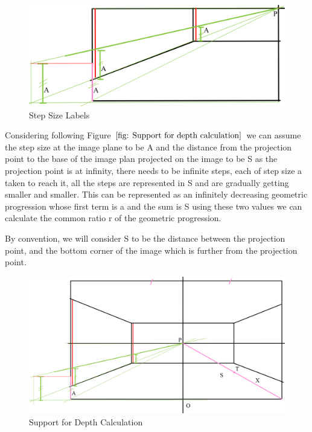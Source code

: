 \documentclass[12pt]{report}
\begin{document}
\begin{figure}[H]
    \centering
    \includegraphics[width=1.0\textwidth]{Calculations6.jpeg}
    \caption{Step Size Labels}
    \label{fig: Step Size label}
\end{figure}

Considering following Figure $\ref{fig: Support for depth calculation}$ we can assume the step size at the image plane to be A and the distance from the projection point to the base of the image plan projected on the image to be S as the projection point is at infinity, there needs to be infinite steps, each of step size a taken to reach it, all the steps are represented in S and are gradually getting smaller and smaller. This can be represented as an infinitely decreasing geometric progression whose first term is a and the sum is S using these two values we can calculate the common ratio r of the geometric progression.\newline

By convention, we will consider S to be the distance between the projection point, and the bottom corner of the image which is further from the projection point.\newline

\begin{figure}[H]
    \centering
    \includegraphics[width=1.0\textwidth]{Calculations7.jpeg}
    \caption{Support for Depth Calculation}
    \label{fig: Support for depth calculation}
\end{figure}
\end{document}
